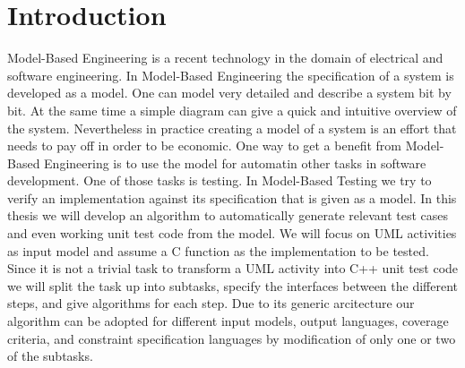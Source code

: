 \chapter{Introduction}
Model-Based Engineering is a recent technology in the domain of electrical and software engineering. In Model-Based Engineering the specification of a system is developed as a model.
One can model very detailed and describe a system bit by bit. At the same time a simple diagram can give a quick and intuitive overview of the system. 
Nevertheless in practice creating a model of a system is an effort that needs to pay off in order to be economic. 
One way to get a benefit from Model-Based Engineering is to use the model for automatin other tasks in software development. One of those tasks is testing. In Model-Based Testing we try to verify an implementation against its specification that is given as a model. In this thesis we will develop an algorithm to automatically generate relevant test cases and even working unit test code from the model. We will focus on UML activities as input model and assume a C function as the implementation to be tested. Since it is not a trivial task to transform a UML activity into C++ unit test code we will split the task up into subtasks, specify the interfaces between the different steps, and give algorithms for each step. Due to its generic arcitecture our algorithm can be adopted for different input models, output languages, coverage criteria, and constraint specification languages by modification of only one or two of the subtasks.
